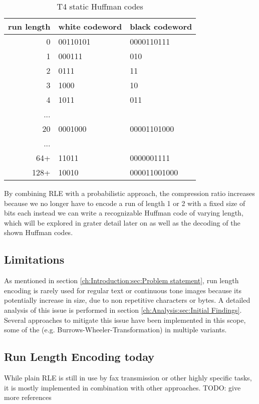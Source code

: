 \begin{table}
	\centering
	\begin{tabular}[p]{r|l|l}
		run length &  white codeword & black codeword\\
		\hline
		0 &  00110101 & 0000110111\\
		1 & 000111 & 010\\
		2 & 0111 & 11\\
		3 & 1000 & 10\\
		4 & 1011 & 011\\
		... &  & \\
		20 & 0001000 & 00001101000\\
		... & & \\
		64+ & 11011 & 0000001111\\
		128+ & 10010 & 000011001000
		\label{tab:t1:static huffman codes}
	\end{tabular}
	\caption{T4 static Huffman codes}
\end{table}
\par{
By combining RLE with a probabilistic approach, the compression ratio increases because we no longer have to encode a run of length 1 or 2 with a fixed size of bits each instead we can write a recognizable Huffman code of varying length, which will be explored in grater detail later on as well as the decoding of the shown Huffman codes.}

\subsection{Limitations}
\par{
As mentioned in section \ref{ch:Introduction:sec:Problem statement}, run length encoding is rarely used for regular text or continuous tone images because its potentially increase in size, due to non repetitive characters or bytes. A detailed analysis of this issue is performed in section \ref{ch:Analysis:sec:Initial Findings}. Several approaches to mitigate this issue have been implemented in this scope, some of the (e.g. Burrows-Wheeler-Transformation) in multiple variants.
}

\subsection{Run Length Encoding today}
\par{
While plain RLE is still in use by fax transmission or other highly specific tasks, it is mostly implemented in combination with other approaches.
TODO: give more references  \cite{rle-dna}
}
